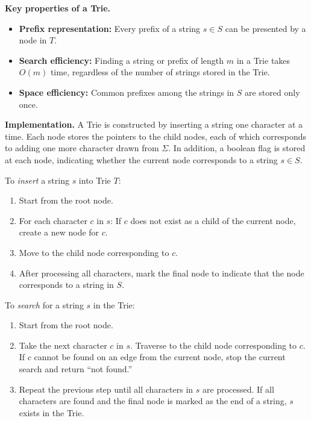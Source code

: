 \begin{tcolorbox}[colframe = blue, title={Reference Reading}, colback = white, enhanced, breakable, 
    skin first=enhanced,
    skin middle=enhanced,
    skin last=enhanced,
    before upper={\parindent15pt}]
\vspace{10pt}
\textbf{Key properties of a Trie.}

\begin{itemize}
    \item \textbf{Prefix representation:} 
    Every prefix of a string $s \in S$ can be presented by a node in $T$. 
    \item \textbf{Search efficiency:} Finding a string or prefix of length $m$ in a Trie takes $O(m)$ time, regardless of the number of strings stored in the Trie.
    \item \textbf{Space efficiency:} Common prefixes among the strings in $S$ are stored only once.
\end{itemize}

\textbf{Implementation.}
A Trie is constructed by inserting a string one character at a time. 
Each node stores the pointers to the child nodes, each of which corresponds to adding one more character drawn from $\Sigma$. In addition, a boolean flag is stored at each node, indicating whether the current node corresponds to a string $s \in S$.


To \textit{insert} a string $s$ into Trie $T$:
\begin{enumerate}[label=(\arabic*)]
    \item Start from the root node.
    \item For each character $c$ in $s$: If $c$ does not exist as a child of the current node, create a new node for $c$.
    \item Move to the child node corresponding to $c$.
    \item After processing all characters, mark the final node to indicate that the node corresponds to a string in $S$.
\end{enumerate}

To \textit{search} for a string $s$ in the Trie:
\begin{enumerate}[label=(\arabic*)]
    \item Start from the root node.
    \item Take the next character $c$ in $s$. Traverse to the child node corresponding to $c$. If $c$ cannot be found on an edge from the current node, stop the current search and return ``not found.''%
    \item Repeat the previous step until all characters in $s$ are processed. If all characters are found and the final node is marked as the end of a string, $s$ exists in the Trie.
\end{enumerate}


\end{tcolorbox}
